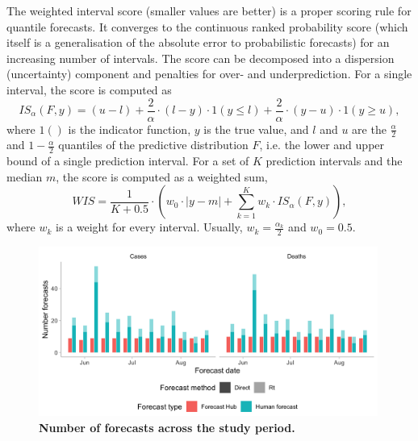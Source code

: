 \documentclass[10pt,a4paper,twocolumn]{article}
\begin{document}
The weighted interval score (smaller values are better) is a proper scoring rule for quantile forecasts. It converges to the continuous ranked probability score (which itself is a generalisation of the absolute error to probabilistic forecasts) for an increasing number of intervals. The score can be decomposed into a dispersion (uncertainty) component and penalties for over- and underprediction. For a single interval, the score is computed as 
  $$IS_\alpha(F,y) = (u-l) + \frac{2}{\alpha} \cdot (l-y) \cdot 1(y \leq l) + \frac{2}{\alpha} \cdot (y-u) \cdot 1(y \geq u), $$ 
  where $1()$ is the indicator function, $y$ is the true value, and $l$ and $u$ are the $\frac{\alpha}{2}$ and $1 - \frac{\alpha}{2}$ quantiles of the predictive distribution $F$, i.e. the lower and upper bound of a single prediction interval. For a set of $K$ prediction intervals and the median $m$, the score is computed as a weighted sum, 
  $$WIS = \frac{1}{K + 0.5} \cdot \left( w_0 \cdot |y - m| + \sum_{k = 1}^{K} w_k \cdot IS_{\alpha}(F, y) \right), $$
  where $w_k$ is a weight for every interval. Usually, $w_k = \frac{\alpha_k}{2}$ and $w_0 = 0.5$. 





\begin{figure}
\centering
\includegraphics[width=0.99\textwidth]{../output/figures/num-forecasters.png}
\caption{\bf{Number of forecasts across the study period.}}
\label{fig:num-forecasters}
\end{figure}
\end{document}
